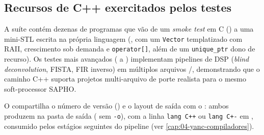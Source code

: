 \subsection{Recursos de C++ exercitados pelos testes}

A suíte  contém dezenas de programas que vão de um
\emph{smoke test} em C () a uma mini-STL escrita na
própria linguagem (, com um \lstinline|Vector|
templatizado com RAII, crescimento sob demanda e \lstinline|operator[]|, além de
um \lstinline|unique_ptr| dono de recurso). Os testes mais avançados
( a ) implementam pipelines de DSP
(\emph{blind deconvolution}, FISTA, FIR inverso) em múltiplos arquivos
/, demonstrando que o caminho C++ suporta projetos
multi-arquivo de porte realista para o mesmo soft-processor SAPHO.

\begin{nota}
O  compartilha o número de versão () e o
layout de saída com o : ambos produzem  na pasta
de saída ( sem \lstinline|-o|), com a linha
\lstinline|lang C++| ou \lstinline|lang C+-| em , consumido
pelos estágios seguintes do pipeline (ver \autoref{cap:04-yanc-compiladores}).
\end{nota}
